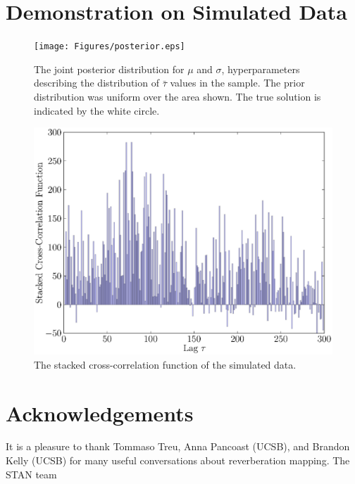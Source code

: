 \documentclass[useAMS,usenatbib]{mn2e}
\begin{document}
\section{Demonstration on Simulated Data}

\begin{figure}
\begin{center}
\texttt{[image: Figures/posterior.eps]}
\caption{The joint posterior distribution for $\mu$ and $\sigma$, hyperparameters
describing the distribution of $\bar{\tau}$ values in the sample. The prior
distribution was uniform over the area shown.
The true solution is indicated by the white circle.\label{fig:posterior}}
\end{center}
\end{figure}

\begin{figure}
\begin{center}
\includegraphics[scale=0.5]{Figures/ccf.eps}
\caption{The stacked cross-correlation function of the simulated data.
\label{fig:ccf}}
\end{center}
\end{figure}



\section*{Acknowledgements}
It is a pleasure to thank Tommaso Treu, Anna Pancoast (UCSB), and
Brandon Kelly (UCSB) for many
useful conversations about reverberation mapping. The STAN team 
\end{document}
